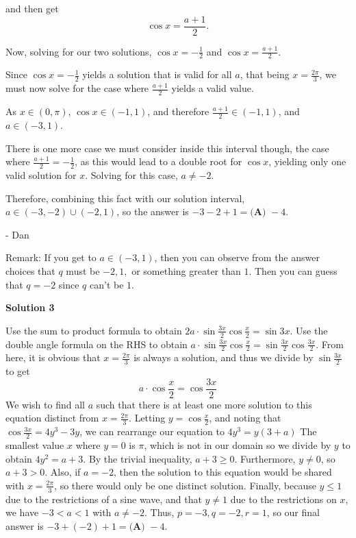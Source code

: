 \begin{enumerate}
 and then get
 \[\cos x = \frac{a+1}{2}.\]

 Now, solving for our two solutions,  $\cos{x} = -\frac{1}{2}$ and $\cos{x} = \frac{a+1}{2}$.

 Since $\cos{x} = -\frac{1}{2}$ yields a solution that is valid for all $a$, that being $x = \frac{2\pi}{3}$, we must now solve for the case where $\frac{a+1}{2}$ yields a valid value.

 As $x\in (0, \pi)$, $\cos{x}\in (-1, 1)$, and therefore $\frac{a+1}{2}\in (-1, 1)$, and $a\in(-3,1)$.

 There is one more case we must consider inside this interval though, the case where $\frac{a+1}{2} = -\frac{1}{2}$, as this would lead to a double root for $\cos{x}$, yielding only one valid solution for $x$. Solving for this case, $a \ne -2$.

 Therefore, combining this fact with our solution interval, $a\in(-3, -2) \cup (-2, 1)$, so the answer is $-3-2+1 = \boxed{\textbf{(A) } {-}4}$.

 - Dan

 Remark: If you get to $a \in (-3, 1)$, then you can observe from the answer choices that $q$ must be $-2, 1,$ or something greater than $1$. Then you can guess that $q=-2$ since $q$ can't be $1$.

 



\textbf{Solution 3}

Use the sum to product formula to obtain $2a\cdot\sin{\frac{3x}{2}}\cos{\frac{x}{2}}=\sin{3x}$. Use the double angle formula on the RHS to obtain $a\cdot\sin{\frac{3x}{2}}\cos{\frac{x}{2}}=\sin{\frac{3x}{2}}\cos{\frac{3x}{2}}$. From here, it is obvious that $x=\frac{2\pi}{3}$ is always a solution, and thus we divide by $\sin{\frac{3x}{2}}$ to get 
 \[a\cdot\cos{\frac{x}{2}}=\cos{\frac{3x}{2}}\] We wish to find all $a$ such that there is at least one more solution to this equation distinct from $x=\frac{2\pi}{3}$. Letting $y=\cos{\frac{x}{2}}$, and noting that $\cos{\frac{3x}{2}}=4y^3-3y$, we can rearrange our equation to $4y^3=y(3+a)$ The smallest value $x$ where $y=0$ is $\pi$, which is not in our domain so we divide by $y$ to obtain $4y^2=a+3$. By the trivial inequality, $a+3\ge{0}$. Furthermore, $y\neq{0}$, so $a+3>0$. Also, if $a=-2$, then the solution to this equation would be shared with $x=\frac{2\pi}{3}$, so there would only be one distinct solution. Finally, because $y\le{1}$ due to the restrictions of a sine wave, and that $y\neq{1}$ due to the restrictions on $x$, we have $-3<a<1$ with $a\neq{-2}$. Thus, $p=-3,q=-2, r=1$, so our final answer is $-3+(-2)+1=\boxed{\textbf{(A) } {-}4}$. 


\end{enumerate}
